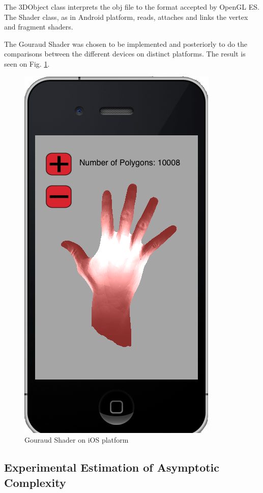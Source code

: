 \documentclass[10pt, conference, compsocconf]{IEEEtran}
\begin{document}
{ The 3DObject class interprets the obj file to the format accepted by OpenGL ES. The Shader class, as in Android platform, reads, attaches and links the vertex
and fragment shaders. 

 The Gouraud Shader was chosen to be implemented and posteriorly to do the
comparisons between the different devices on distinct platforms. The result is seen on Fig. \ref{gouraud_ios}.

	\begin{figure}[!t]
	\centering
		\includegraphics[keepaspectratio=true,scale=0.25]{figures/gouraud_ios.png}
	\caption{Gouraud Shader on iOS platform }
	\label{gouraud_ios}
	\end{figure}
	
\subsection{Experimental Estimation of Asymptotic Complexity}
\label{sec:assy}

}
\end{document}
